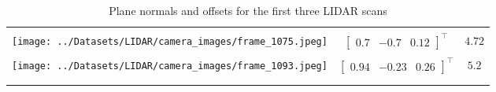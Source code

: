 \documentclass[10pt]{article}
\begin{document}
\begin{enumerate}
\begin{longtable}{c|c|c}
            & & \\
            \texttt{[image: ../Datasets/LIDAR/camera\_images/frame\_1075.jpeg]}
            & $\begin{bmatrix} 0.7 & -0.7 & 0.12 \end{bmatrix}^{\top}$ & $4.72$ \\
            & & \\
            \texttt{[image: ../Datasets/LIDAR/camera\_images/frame\_1093.jpeg]}
            & $\begin{bmatrix} 0.94 & -0.23 & 0.26 \end{bmatrix}^{\top}$ & $5.2$ \\
            & & \\
            \caption{Plane normals and offsets for the first three LIDAR scans}
            \label{tab:lidar-normals}
        \end{longtable}


\end{enumerate}
\end{document}
